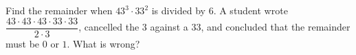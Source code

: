 Find the remainder when $43^3\cdot33^2$ is divided by $6$. A student wrote $\dfrac{43\cdot43\cdot43\cdot33\cdot33}{2\cdot3}$, cancelled the $3$ against a $33$, and concluded that the remainder must be $0$ or $1$. What is wrong?
